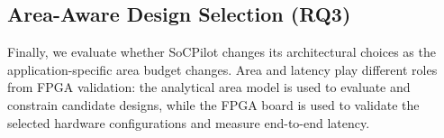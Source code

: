 \subsection{Area-Aware Design Selection (RQ3)}
\label{subsec:area_aware}

Finally, we evaluate whether SoCPilot changes its architectural choices as the application-specific area budget changes. Area and latency play different roles from FPGA validation: the analytical area model is used to evaluate and constrain candidate designs, while the FPGA board is used to validate the selected hardware configurations and measure end-to-end latency.

\begin{table}[t]
\centering
\caption{CPU--accelerator configurations selected by SoCPilot under different area constraints.}
\label{tab:area_aware}
\renewcommand{\arraystretch}{1.12}
\end{table}

